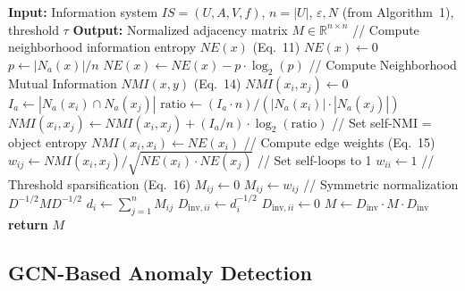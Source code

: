 \documentclass[lettersize,journal]{IEEEtran}
\begin{document}
\begin{algorithm}[!t]
\caption{NMI-based Graph Construction (NGC)}
\label{alg:ngc}
\begin{algorithmic}
\STATE \textbf{Input:} Information system \(IS = (U, A, V, f)\), \(n = |U|\),
       \(\varepsilon, N\) (from Algorithm~1), threshold \(\tau\)
\STATE \textbf{Output:} Normalized adjacency matrix \(M \in \mathbb{R}^{n \times n}\)
\STATE
\STATE // Compute neighborhood information entropy \(NE(x)\) (Eq.~11)
    \STATE \(NE(x) \leftarrow 0\)
        \STATE \(p \leftarrow |N_{a}(x)| / n\)
            \STATE \(NE(x) \leftarrow NE(x) - p \cdot \log_{2}(p)\)
        \ENDIF
    \ENDFOR
\ENDFOR
\STATE
\STATE // Compute Neighborhood Mutual Information \(NMI(x, y)\) (Eq.~14)
    \STATE \(NMI(x_{i}, x_{j}) \leftarrow 0\)
        \STATE \(I_{a} \leftarrow |N_{a}(x_{i}) \cap N_{a}(x_{j})|\)
            \STATE \(\text{ratio} \leftarrow (I_{a} \cdot n) / (|N_{a}(x_{i})| \cdot |N_{a}(x_{j})|)\)
            \STATE \(NMI(x_{i}, x_{j}) \leftarrow NMI(x_{i}, x_{j}) + (I_{a} / n) \cdot \log_{2}(\text{ratio})\)
        \ENDIF
    \ENDFOR
\ENDFOR
\STATE // Set self-NMI = object entropy
    \STATE \(NMI(x_{i}, x_{i}) \leftarrow NE(x_{i})\)
\ENDFOR
\STATE
\STATE // Compute edge weights (Eq.~15)
    \STATE \(w_{ij} \leftarrow NMI(x_{i}, x_{j}) / \sqrt{NE(x_{i}) \cdot NE(x_{j})}\)
\ENDFOR
\STATE // Set self-loops to 1
 \STATE \(w_{ii} \leftarrow 1\) \ENDFOR
\STATE
\STATE // Threshold sparsification (Eq.~16)
     \STATE \(M_{ij} \leftarrow 0\)
    \ELSE \STATE \(M_{ij} \leftarrow w_{ij}\) \ENDIF
\ENDFOR
\STATE
\STATE // Symmetric normalization \(D^{-1/2} M D^{-1/2}\)
    \STATE \(d_{i} \leftarrow \sum_{j=1}^{n} M_{ij}\)
     \STATE \(D_{\text{inv}, ii} \leftarrow d_{i}^{-1/2}\)
    \ELSE \STATE \(D_{\text{inv}, ii} \leftarrow 0\) \ENDIF
\ENDFOR
\STATE \(M \leftarrow D_{\text{inv}} \cdot M \cdot D_{\text{inv}}\)
\STATE \textbf{return} \(M\)
\end{algorithmic}
\end{algorithm}

\subsection{GCN-Based Anomaly Detection}
\end{document}
